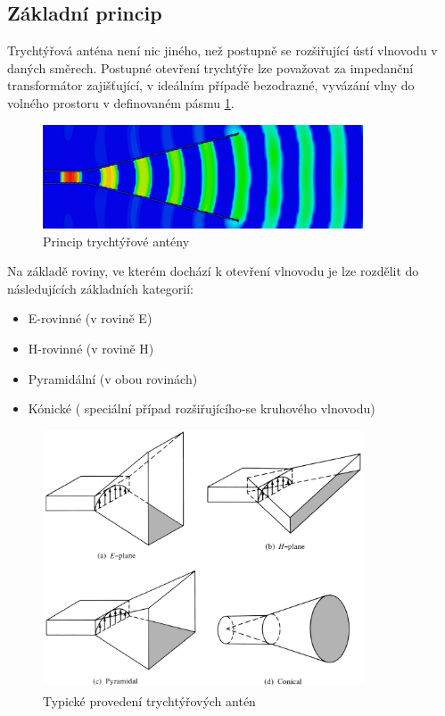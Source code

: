 \subsection{Základní princip}
Trychtýřová anténa není nic jiného, než postupně se rozšiřující ústí vlnovodu v daných směrech. Postupné otevření trychtýře lze považovat za impedanční transformátor zajišťující, v ideálním případě bezodrazné, vyvázání vlny do volného prostoru v definovaném pásmu \ref{fig:hornPrinciple}.

\begin{figure}[!htbp]
\begin{center}
\includegraphics[width=9.5cm]{pics/HornPrinciple}
\caption{Princip trychtýřové antény}
\label{fig:hornPrinciple}
\end{center}
\end{figure}

Na základě roviny, ve kterém dochází k otevření vlnovodu je lze rozdělit do následujících základních kategorií:
\begin{itemize}
\item E-rovinné (v rovině E)
\item H-rovinné (v rovině H)
\item Pyramidální (v obou rovinách)
\item Kónické ( speciální případ rozšiřujícího-se kruhového vlnovodu)
\end{itemize}

\begin{figure}[!htbp]
\begin{center}
\includegraphics[width=9.5cm]{pics/HornTypes}
\caption{Typické provedení trychtýřových antén \cite{ConstantineTheory}}
\label{fig:horn}
\end{center}
\end{figure}

